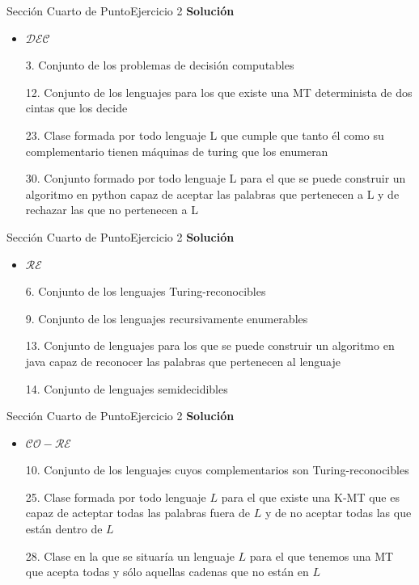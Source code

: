 \documentclass[10pt, envcountsect, presentation, aspectratio=169]{beamer}
\newcommand{\ld}{\ensuremath{\mathcal {DEC}}}
\newcommand{\lr}{\ensuremath{\mathcal {RE}}}
\begin{document}

\begin{frame}{Sección Cuarto de Punto}{Ejercicio 2}
    \textbf{Solución}\\
    \begin{itemize}
        \item $\ld$
        \item[3.] Conjunto de los problemas de decisión computables
        \item[12.] Conjunto de los lenguajes para los que existe una MT determinista de dos cintas que los decide
        \item[23.] Clase formada por todo lenguaje L que cumple que tanto él como su complementario tienen máquinas de turing que los enumeran
        \item[30.] Conjunto formado por todo lenguaje L para el que se puede construir un algoritmo en python capaz de aceptar las palabras que pertenecen a L y de rechazar las que no pertenecen a L
    \end{itemize}
\end{frame}


\begin{frame}{Sección Cuarto de Punto}{Ejercicio 2}
    \textbf{Solución}\\
    \begin{itemize}
        \item $\lr$
        \item[6.] Conjunto de los lenguajes Turing-reconocibles
        \item[9.] Conjunto de los lenguajes recursivamente enumerables
        \item[13.] Conjunto de lenguajes para los que se puede construir un algoritmo en java capaz de reconocer las palabras que pertenecen al lenguaje
        \item[14.] Conjunto de lenguajes semidecidibles
    \end{itemize}
\end{frame}


\begin{frame}{Sección Cuarto de Punto}{Ejercicio 2}
    \textbf{Solución}\\
    \begin{itemize}
        \item $\mathcal{CO-RE}$
        \item[10.] Conjunto de los lenguajes cuyos complementarios son Turing-reconocibles 
        \item[25.] Clase formada por todo lenguaje $L$ para el que existe una K-MT que es capaz de acteptar todas las palabras fuera de $L$ y de no aceptar todas las que están dentro de $L$
        \item[28.] Clase en la que se situaría un lenguaje $L$ para el que tenemos una MT que acepta todas y sólo aquellas cadenas que no están en $L$
    \end{itemize}
\end{frame}
\end{document}
